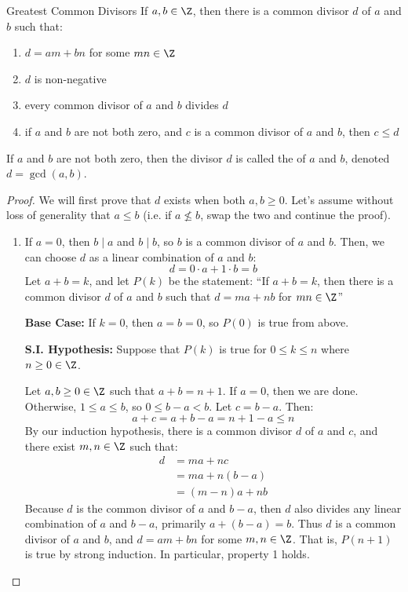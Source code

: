 \documentclass[letterpaper,12pt]{report}
\begin{document}
\begin{thmbox}{Greatest Common Divisors}{}
	If $a,b \in \Z$, then there is a common divisor $d$ of $a$ and $b$ such that:
	\begin{enumerate}
		\item $d = am+bn$ for some $mn \in \Z$
		\item $d$ is non-negative
		\item every common divisor of $a$ and $b$ divides $d$
		\item if $a$ and $b$ are not both zero, and $c$ is a common divisor of $a$ and $b$, then $c \leq d$
	\end{enumerate}
	If $a$ and $b$ are not both zero, then the divisor $d$ is called the  of $a$ and $b$, denoted $d = \gcd(a,b)$.
\end{thmbox}
\begin{proof}
	We will first prove that $d$ exists when both $a,b \geq 0$. Let's assume without loss of generality that $a \leq b$ (i.e. if $a \not \leq b$, swap the two and continue the proof).

	\begin{enumerate}
		\item If $a = 0$, then $b \mid a$ and $b \mid b$, so $b$ is a common divisor of $a$ and $b$. Then, we can choose $d$ as a linear combination of $a$ and $b$:
		$$d = 0\cdot a + 1 \cdot b = b$$
		Let $a+b = k$, and let $P(k)$ be the statement: ``If $a+b=k$, then there is a common divisor $d$ of $a$ and $b$ such that $d = ma+nb$ for $mn \in \Z$''

		\textbf{Base Case:} If $k=0$, then $a=b=0$, so $P(0)$ is true from above.

		\textbf{S.I. Hypothesis:} Suppose that $P(k)$ is true for $0 \leq k \leq n$ where $n \geq 0 \in \Z$.

		Let $a,b \geq 0 \in \Z$ such that $a+b = n+1$. If $a=0$, then we are done. Otherwise, $1 \leq a \leq b$, so $0 \leq b-a < b$. Let $c = b-a$. Then:
		$$a+c = a+b-a = n+1-a \leq n$$
		By our induction hypothesis, there is a common divisor $d$ of $a$ and $c$, and there exist $m,n \in \Z$ such that:
		\begin{align*}
			d &= ma+nc \\
			&= ma + n(b-a) \\
			&= (m-n)a + nb
		\end{align*}
		Because $d$ is the common divisor of $a$ and $b-a$, then $d$ also divides any linear combination of $a$ and $b-a$, primarily $a + (b-a) = b$. Thus $d$ is a common divisor of $a$ and $b$, and $d = am+bn$ for some $m,n \in \Z$. That is, $P(n+1)$ is true by strong induction. In particular, property 1 holds.


\end{enumerate}
\end{proof}
\end{document}
